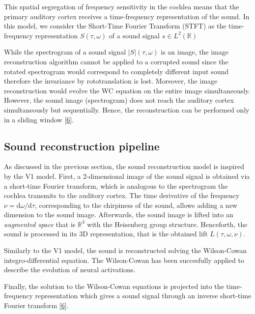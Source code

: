 \documentclass[american,]{article}
\theoremstyle{definition}
\theoremstyle{definition}
\theoremstyle{definition}
\theoremstyle{remark}
\begin{document}
This spatial segregation of frequency sensitivity in the cochlea
means that the primary auditory cortex receives a time-frequency representation of the sound.
In this model, we consider the Short-Time Fourier Transform (STFT)
as the time-frequency representation \(S(\tau,\omega)\) of a sound signal \(s\in L^2(\mathbb{R})\)

While the spectrogram of a sound signal \(\left\lvert S\right\rvert(\tau,\omega)\) is an image,
the image reconstruction algorithm cannot be applied to a corrupted sound
since the rotated spectrogram would correspond to completely different input sound
therefore the invariance by rototranslation is lost.
Moreover, the image reconstruction would evolve the WC equation on the entire
image simultaneously. However, the sound image (spectrogram) does not reach
the auditory cortex simultaneously but sequentially.
Hence, the reconstruction can be performed only in a sliding window {[}\protect\hyperlink{ref-boscain2021}{6}{]}.

\hypertarget{sound-reconstruction-pipeline}{%
\subsection{Sound reconstruction pipeline}\label{sound-reconstruction-pipeline}}

As discussed in the previous section, the sound reconstruction model
is inspired by the V1 model.
First, a 2-dimensional image of the sound signal is obtained via a short-time Fourier transform,
which is analogous to the spectrogram the cochlea transmits to the auditory cortex.
The time derivative of the frequency \(\nu=\mathrm{d}\omega/\mathrm{d}\tau\), corresponding to the chirpiness of the sound,
allows adding a new dimension to the sound image.
Afterwards, the sound image is lifted into an \emph{augmented space} that is \(\mathbb{R}^3\)
with the Heisenberg group structure.
Henceforth, the sound is processed in its 3D representation,
that is the obtained lift \(L(\tau,\omega,\nu)\).

Similarly to the V1 model, the sound is reconstructed solving
the Wilson-Cowan integro-differential equation.
The Wilson-Cowan has been succesfully applied to describe the evolution of neural activations.

Finally, the solution to the Wilson-Cowan equations is projected into
the time-frequency representation which gives a sound signal through
an inverse short-time Fourier transform {[}\protect\hyperlink{ref-boscain2021}{6}{]}.
\end{document}
